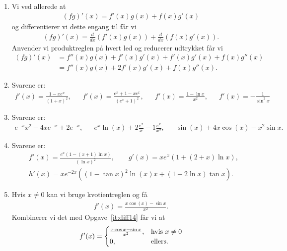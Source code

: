 \begin{enumerate}
	
	\item Vi ved allerede at
	\begin{align*}
	(fg)'(x)=f'(x)g(x)+f(x)g'(x)
	\end{align*}
	og differentierer vi dette engang til får vi
	\begin{align*}
	(fg)'(x)=\frac{d}{dx}( f'(x)g(x))+\frac{d}{dx}(f(x)g'(x)).
	\end{align*}
	Anvender vi produktreglen på hvert led og reducerer udtrykket får vi
	\begin{align*}
	(fg)'(x)&=f''(x)g(x)+f'(x)g'(x)+f'(x)g'(x)+f(x)g''(x)\\
	&=f''(x)g(x)+2f'(x)g'(x)+f(x)g''(x).
	\end{align*}
	
	\item Svarene er:
	\begin{align*}
	f'(x)=\frac{1-xe^x}{(1+x)^2},&&f'(x)=\frac{e^x+1-xe^x}{(e^x+1)^2},&&f'(x)=\frac{1-\ln x}{x^2},&& f'(x)=-\frac{1}{\sin^2 x}
	\end{align*}
	
	\item Svarene er:
	\begin{align*}
	e^{-x}x^2-4xe^{-x}+2e^{-x},&& e^x\ln(x)+ 2\frac{e^x}{x}-1\frac{e^x}{x^2},&& \sin(x)+4x\cos(x)-x^2\sin x.
	\end{align*}
	
	
	
	
	
	\item Svarene er:
	\begin{align*}
	&f'(x)=\frac{e^x(1-(x+1)\ln x)}{(\ln x)^2},\qquad g'(x)=xe^x(1+(2+x)\ln x),\\ &h'(x)=xe^{-2x}((1-\tan x)^2\ln(x)x+(1+2\ln x)\tan x).
	\end{align*}
	
	
	
	
	\item\label{it:diff22} Hvis $x\neq 0$ kan vi bruge kvotientreglen og få
	\begin{align*}
	f'(x)=\frac{x\cos(x)-\sin x}{x^2}.
	\end{align*}
	Kombinerer vi det med Opgave~\ref{it:diff14} får vi at
	\begin{align*}
	f'(x)=\begin{cases}
	\frac{x\cos x-\sin x}{x^2},&\textup{hvis }x\neq 0\\
	0,&\textup{ellers}. 
	\end{cases}
	\end{align*}
	

\end{enumerate}
